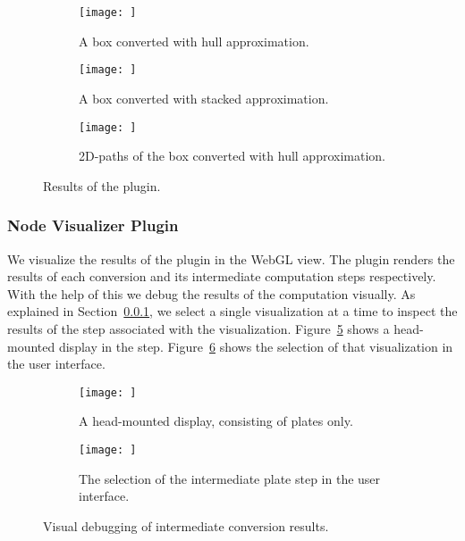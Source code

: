 \documentclass[../ClassicThesis.tex]{subfiles}
\begin{document}
\begin{figure}[h]
  \centering
  \begin{subfigure}[a]{0.3222\textwidth}
    \texttt{[image: ]}
    \caption{A box converted with hull approximation.}
    \label{fig:conversion:plate}
  \end{subfigure}
  \begin{subfigure}[b]{0.3222\textwidth}
    \texttt{[image: ]}
    \caption{A box converted with stacked approximation.}
    \label{fig:conversion:stacked}
  \end{subfigure}
  \begin{subfigure}[c]{0.3222\textwidth}
    \texttt{[image: ]}
    \caption{2D-paths of the box converted with hull approximation.}
    \label{fig:conversion:paths}
  \end{subfigure}
  \caption{Results of the  plugin.}
  \label{fig:conversion}
\end{figure}


\subsubsection{Node Visualizer Plugin}

We visualize the results of the 
plugin in the WebGL view. The  plugin
renders the results of each conversion and its intermediate
computation steps respectively. With the help of this we
debug the results of the computation visually. As explained
in Section~\ref{}, we select a
single visualization at a time to inspect the results of the
step associated with the visualization.
Figure~\ref{fig:steps:plate} shows a head-mounted display in
the  step. Figure~\ref{fig:steps:ui} shows the
selection of that visualization in the user interface.

\begin{figure}[h]
  \centering
  \begin{subfigure}[a]{0.48\textwidth}
    \texttt{[image: ]}
    \caption{A head-mounted display, consisting of plates only.}
    \label{fig:steps:plate}
  \end{subfigure}
  \begin{subfigure}[b]{0.48\textwidth}
    \texttt{[image: ]}
    \caption{The selection of the intermediate plate step in
      the user interface.}
    \label{fig:steps:ui}
  \end{subfigure}
  \label{fig:steps}
  \caption{Visual debugging of intermediate conversion results.}
\end{figure}
\end{document}
